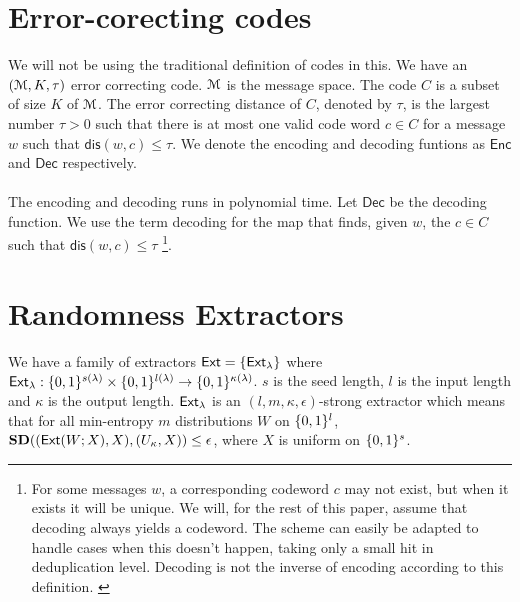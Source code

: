 \section{Error-corecting codes}
We will not be using the traditional definition of codes in this.
We have an $(\mathcal{M}, K, \tau)$ error correcting code. $\mathcal{M}$ is the message space. The code $C$ is a subset of size $K$ of $\mathcal{M}$. The error correcting distance of $C$, denoted by $\tau$, is the largest number $\tau > 0$ such that there is at most one valid code word $c \in C$ for a message $w$ such that $\mathsf{dis}(w,c) \leq \tau$. We denote the encoding and decoding funtions as $\mathsf{Enc}$ and $\mathsf{Dec}$ respectively.
\\ \\The encoding and decoding runs in polynomial time. Let $\mathsf{Dec}$ be the decoding function. We use the term decoding for the map that finds, given $w$, the $c \in C$ such that $\mathsf{dis}(w,c) \leq \tau$\cite{fuzzy} \footnote{For some messages $w$, a corresponding codeword $c$ may not exist, but when it exists it will be unique. We will, for the rest of this paper, assume that decoding always yields a codeword. The scheme can easily be adapted to handle cases when this doesn't happen, taking only a small hit in deduplication level. Decoding is not the inverse of encoding according to this definition. \cite{fuzzy}}.

\section{Randomness Extractors}
We have a family of extractors $\mathsf{Ext} = \{\mathsf{Ext}_{\lambda}\}$ where $\mathsf{Ext}_{\lambda} : \{0,1\}^{s(\lambda)} \times \{0,1\}^{l(\lambda)} \rightarrow \{0,1\}^{\kappa(\lambda)}$. $s$ is the seed length, $l$ is the input length and $\kappa$ is the output length. $\mathsf{Ext}_{\lambda}$ is an $(l,m,\kappa,\epsilon)$-strong extractor which means that for all min-entropy  $m$ distributions $W$ on $\{0,1\}^l$, $\textbf{SD}((\mathsf{Ext}(W; X), X), (U_\kappa,X )) \leq \epsilon $, where $X$ is uniform on $\{0,1\}^s$\cite{fuzzy}.

